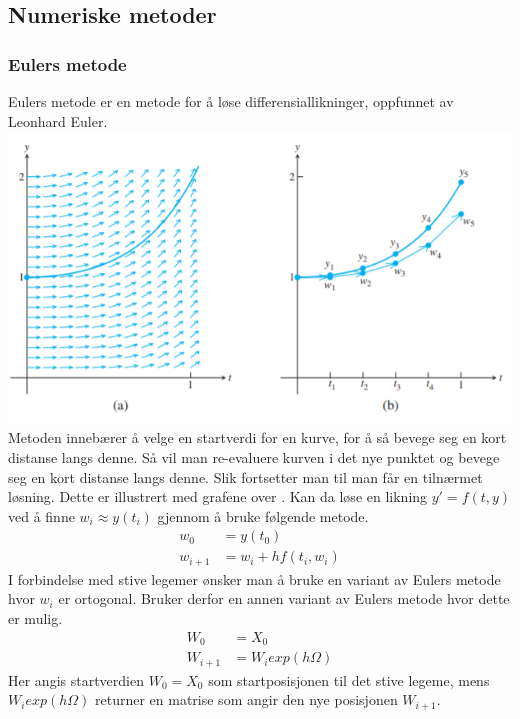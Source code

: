 \graphicspath{ {./bilder/} }
\subsection{Numeriske metoder}
\subsubsection{Eulers metode}
Eulers metode er en metode for å løse differensiallikninger, oppfunnet av Leonhard Euler. \newline
\includegraphics{rapport/teori/bilder/eulers.png}\newline\newline
Metoden innebærer å velge en startverdi for en kurve, for å så bevege seg en kort distanse langs denne. Så vil man re-evaluere kurven i det nye punktet og bevege seg en kort distanse langs denne. Slik fortsetter man til man får en tilnærmet løsning. Dette er illustrert med grafene over \cite{MATEMATIKK:1}.\newline\newline
Kan da løse en likning $y' = f(t, y)$ ved å finne $w_i \approx y(t_i)$ gjennom å bruke følgende metode.
\begin{equation}
\begin{aligned}
    w_0&=y(t_0)\\
    w_{i+1}&=w_i + hf(t_i, w_i)
\end{aligned}
\end{equation}
I forbindelse med stive legemer ønsker man å bruke en variant av Eulers metode hvor $w_i$ er ortogonal. Bruker derfor en annen variant av Eulers metode hvor dette er mulig.
\begin{equation}
\begin{aligned}
    W_0&=X_0\\
    W_{i+1}&=W_iexp(h\Omega)
\end{aligned}
\end{equation}
Her angis startverdien $W_0=X_0$ som startposisjonen til det stive legeme, mens $W_iexp(h\Omega)$ returner en matrise som angir den nye posisjonen $W_{i+1}$.

